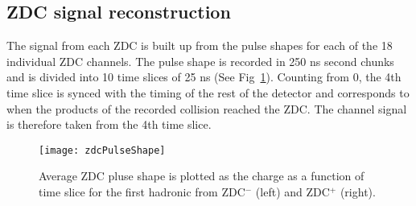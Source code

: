     \subsection{ZDC signal reconstruction}
      The signal from each ZDC is built up from the pulse shapes for each of 
        the 18 individual ZDC channels. 
      The pulse shape is recorded in 250 ns second chunks and is divided into
        10 time slices of 25 ns (See Fig~\ref{fig:zdcPulseShape}).
      Counting from 0, the 4th time slice is synced with the timing of the rest
        of the detector and corresponds to when the products of the recorded 
        collision reached the ZDC.
      The channel signal is therefore taken from the 4th time slice.
      \begin{figure}[h]
        \centering
        \texttt{[image: zdcPulseShape]}
        \caption{Average ZDC pluse shape is plotted as the charge as a function
          of time slice for the first hadronic from ZDC$^{-}$ (left) and 
          ZDC$^{+}$ (right).}
        \label{fig:zdcPulseShape}
      \end{figure}

